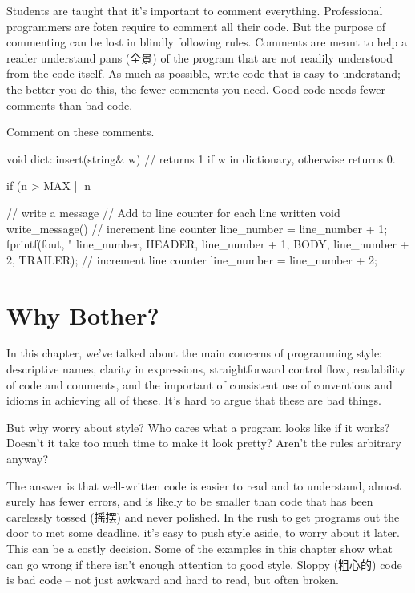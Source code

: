 Students are taught that it's important to comment everything. Professional
programmers are foten require to comment all their code. But the purpose of
commenting can be lost in blindly following rules. Comments are meant to
help a reader understand pans (全景) of the program that are not readily
understood from the code itself. As much as possible, write code that is
easy to understand; the better you do this, the fewer comments you need.
Good code needs fewer comments than bad code.

\begin{exercise}
    Comment on these comments.
    \begin{badcode}
        void dict::insert(string& w)
        // returns 1 if w in dictionary, otherwise returns 0.
    \end{badcode}
    \begin{badcode}
        if (n > MAX || n %
    \end{badcode}
    \begin{badcode}
        // write a message
        // Add to line counter for each line written
        void write_message()
        {
            // increment line counter
            line_number = line_number + 1;
            fprintf(fout, "%
                line_number, HEADER,
                line_number + 1, BODY,
                line_number + 2, TRAILER);
            // increment line counter
            line_number = line_number + 2;
        }
    \end{badcode}
\end{exercise}

\section{Why Bother?}
\label{sec:why_bother}
In this chapter, we've talked about the main concerns of programming style:
descriptive names, clarity in expressions, straightforward control flow,
readability of code and comments, and the important of consistent use of
conventions and idioms in achieving all of these. It's hard to argue that
these are bad things.

But why worry about style? Who cares what a program looks like if it works?
Doesn't it take too much time to make it look pretty? Aren't the rules
arbitrary anyway?

The answer is that well-written code is easier to read and to understand,
almost surely has fewer errors, and is likely to be smaller than code that
has been carelessly tossed (摇摆) and never polished. In the rush to get
programs out the door to met some deadline, it's easy to push style aside,
to worry about it later. This can be a costly decision. Some of the
examples in this chapter show what can go wrong if there isn't enough
attention to good style. Sloppy (粗心的) code is bad code -- not just
awkward and hard to read, but often broken.

